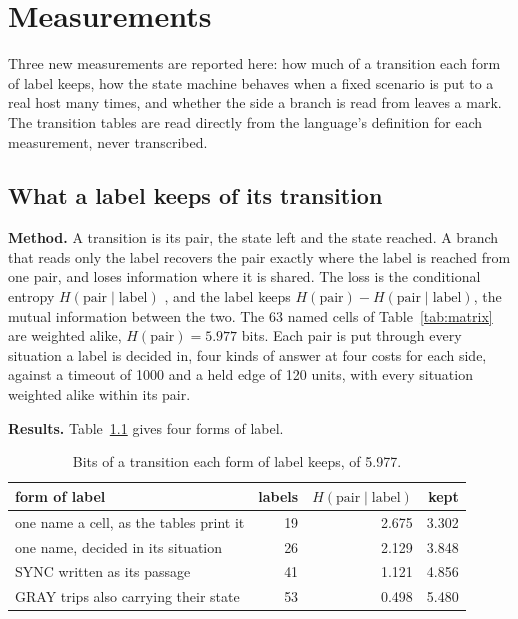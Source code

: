 \chapter{Measurements}
\label{ch:measured}

Three new measurements are reported here: how much of a transition each form of label keeps, how
the state machine behaves when a fixed scenario is put to a real host many times, and whether the
side a branch is read from leaves a mark. The transition tables are read directly from the
language's definition for each measurement, never transcribed.

\section{What a label keeps of its transition}
\label{sec:labels}

\textbf{Method.} A transition is its pair, the state left and the state reached. A branch that
reads only the label recovers the pair exactly where the label is reached from one pair, and loses
information where it is shared. The loss is the conditional entropy
\(H(\text{pair} \mid \text{label})\) \cite{src:Shannon}, and the label keeps
\(H(\text{pair}) - H(\text{pair} \mid \text{label})\), the mutual information between the two.
The 63 named cells of Table~\ref{tab:matrix} are weighted alike, \(H(\text{pair}) = 5.977\) bits.
Each pair is put through every situation a label is decided in, four kinds of answer at four
costs for each side, against a timeout of 1000 and a held edge of 120 units, with every situation
weighted alike within its pair.

\textbf{Results.} Table~\ref{tab:labelbits} gives four forms of label.

\begin{table}[h]
\centering
\small
\begin{tabular}{@{}l r r r@{}}
\toprule
form of label & labels & \(H(\text{pair}\mid\text{label})\) & kept \\
\midrule
one name a cell, as the tables print it & 19 & 2.675 & 3.302 \\
one name, decided in its situation & 26 & 2.129 & 3.848 \\
SYNC written as its passage & 41 & 1.121 & 4.856 \\
GRAY trips also carrying their state & 53 & 0.498 & 5.480 \\
\bottomrule
\end{tabular}
\caption{Bits of a transition each form of label keeps, of 5.977.}
\label{tab:labelbits}
\end{table}

